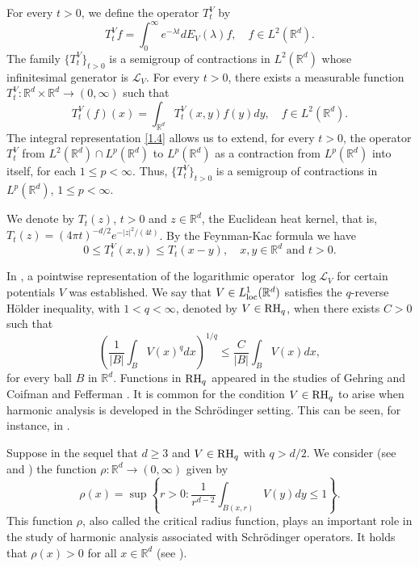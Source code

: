 \documentclass[10pt, a4paper, reqno]{amsart}
\theoremstyle{definition}
\theoremstyle{remark}
\newcommand{\RH}{\textup{RH}}
\numberwithin{equation}{section}
\begin{document}
For every $t>0$, we define the operator $T_t^V$ by
\[
T_t^Vf=\int_0^\infty e^{-\lambda t}dE_V(\lambda )f,\quad f\in L^2(\mathbb R^d).
\]
The family $\{T_t^V\}_{t>0}$ is a semigroup of contractions in $L^2(\mathbb R^d)$ whose infinitesimal generator is $\mathcal L_V$. For every $t>0$, there exists a measurable function $T_t^V:\mathbb R^d\times \mathbb R^d\rightarrow (0,\infty)$ such that
\begin{equation}\label{1.4}
T_t^V(f)(x)=\int_{\mathbb R^d}T_t^V(x,y)f(y)dy,\quad f\in L^2(\mathbb R^d). 
\end{equation}
The integral representation \eqref{1.4} allows us to extend, for every $t>0$, the operator $T_t^V$ from $L^2(\mathbb R^d)\cap L^p(\mathbb R^d)$ to $L^p(\mathbb R^d)$ as a contraction from $L^p(\mathbb R^d)$ into itself, for each $1\leq p<\infty$. Thus, $\{T_t^V\}_{t>0}$ is a semigroup of contractions in $L^p(\mathbb R^d)$, $1\leq p<\infty$.

We denote by $T_t(z)$, $t>0$ and $z\in \mathbb R^d$, the Euclidean heat kernel, that is, $T_t(z)=(4\pi t)^{-d/2}e^{-|z|^2/(4t)}$. By the Feynman-Kac formula we have
\begin{equation}\label{1.6}
0\leq T_t^V(x,y)\leq T_t(x-y),\quad x,y\in \mathbb R^d \mbox{ and }t>0.
\end{equation}



In \cite[Theorem 1.2]{BDFQ},  a pointwise representation of the logarithmic operator $\log \mathcal L_V$ for certain potentials $V$ was established. We say that $V\in L^1_\textup{loc} (\mathbb R^d)$ satisfies the $q$-reverse H\"older inequality, with $1<q<\infty$, denoted by $V\in \RH_q$, when there exists $C>0$ such that
\[
\left(\frac{1}{|B|}\int_BV(x)^qdx\right)^{1/q}\leq \frac{C}{|B|}\int_B V(x)dx,
\]
for every ball $B$ in $\mathbb R^d$. Functions in $\RH_q$ appeared in the studies of Gehring \cite{G} and Coifman and Fefferman \cite{CF}. It is common for the condition $V\in \RH_q$ to arise when harmonic analysis is developed in the Schr\"odinger setting. This can be seen, for instance, in \cite{BFHR, BHQ, Dz1, Dz2, DGMTZ, GHY, Sh1, ZT}.

Suppose in the sequel that $d\geq 3$ and $V\in \RH_q$ with $q>d/2$. We consider (see \cite{Sh2} and \cite[Definition 1.3]{Sh1}) the function $\rho :\mathbb R^d\rightarrow (0,\infty)$ given by
\[
\rho (x)=\sup\left\{r>0: \frac{1}{r^{d-2}}\int_{B(x,r)}V(y)dy\leq 1\right\}.
\]
This function $\rho$, also called the critical radius function, plays an important role in the study of harmonic analysis associated with Schr\"odinger operators. It holds that $\rho (x)>0$ for all $x\in \mathbb R^d$ (see \cite[\S1]{Sh1}).
\end{document}
